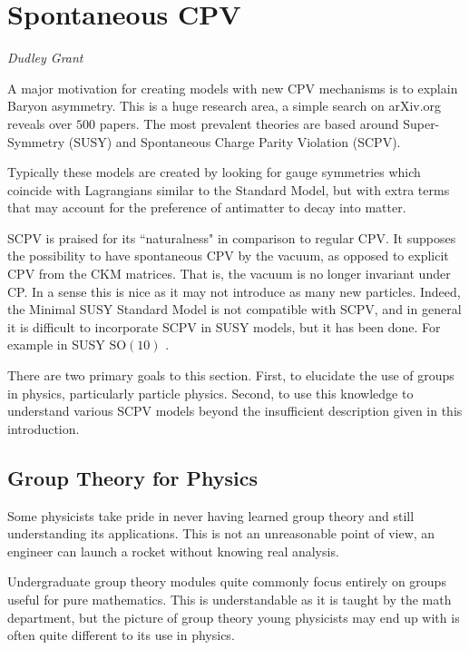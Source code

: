 \section{Spontaneous CPV} 
\vspace{-1.0em}
\begin{center}
\tiny{\textit{Dudley Grant}}
\end{center}

A major motivation for creating models with new CPV mechanisms is to explain Baryon asymmetry. This is a huge research area, a simple search on arXiv.org reveals over $500$ papers. The most prevalent theories are based around Super-Symmetry (SUSY) and Spontaneous Charge Parity Violation (SCPV). 

Typically these models are created by looking for gauge symmetries which coincide with Lagrangians similar to the Standard Model, but with extra terms that may account for the preference of antimatter to decay into matter.  

SCPV is praised for its ``naturalness" in comparison to regular CPV\cite{SCPV1}. It supposes the possibility to have spontaneous CPV by the vacuum, as opposed to explicit CPV from the CKM matrices. That is, the vacuum is no longer invariant under CP. In a sense this is nice as it may not introduce as many new particles. Indeed, the Minimal SUSY Standard Model is not compatible with SCPV, and in general it is difficult to incorporate SCPV in SUSY models\cite{SCPV1}, but it has been done. For example in SUSY $\mathrm{SO}(10)$ \cite{SCPV2}.

There are two primary goals to this section. First, to elucidate the use of groups in physics, particularly particle physics. Second, to use this knowledge to understand various SCPV  models beyond the insufficient description given in this introduction.

\subsection{Group Theory for Physics}
Some physicists take pride in never having learned group theory and still understanding its applications. This is not an unreasonable point of view, an engineer can launch a rocket without knowing real analysis. 

Undergraduate group theory modules quite commonly focus entirely on groups useful for pure mathematics. This is understandable as it is taught by the math department, but the picture of group theory young physicists may end up with is often quite different to its use in physics.



